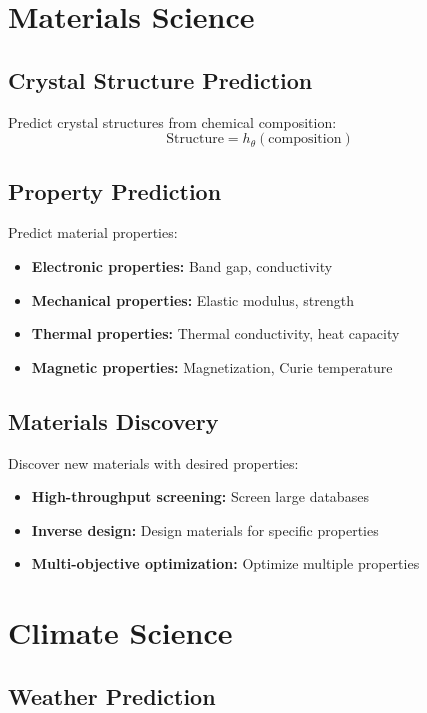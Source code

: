 \section{Materials Science}

\subsection{Crystal Structure Prediction}

Predict crystal structures from chemical composition:
\begin{equation}
    \text{Structure} = h_\theta(\text{composition})
\end{equation}

\subsection{Property Prediction}

Predict material properties:
\begin{itemize}
    \item \textbf{Electronic properties:} Band gap, conductivity
    \item \textbf{Mechanical properties:} Elastic modulus, strength
    \item \textbf{Thermal properties:} Thermal conductivity, heat capacity
    \item \textbf{Magnetic properties:} Magnetization, Curie temperature
\end{itemize}

\subsection{Materials Discovery}

Discover new materials with desired properties:
\begin{itemize}
    \item \textbf{High-throughput screening:} Screen large databases
    \item \textbf{Inverse design:} Design materials for specific properties
    \item \textbf{Multi-objective optimization:} Optimize multiple properties
\end{itemize}

\section{Climate Science}

\subsection{Weather Prediction}

